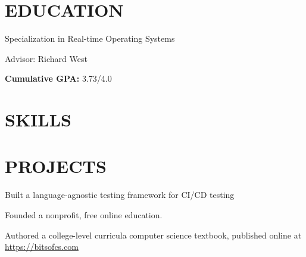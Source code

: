 \documentclass[10pt]{article} 
\begin{document}
\begin{FlushLeft}

  \section{EDUCATION}
  \begin{itemize}{
    \item Specialization in Real-time Operating Systems
    \item Advisor: Richard West}            
  \end{itemize}
  \begin{itemize}{
    \item \textbf{Cumulative GPA:} 3.73/4.0 }
  \end{itemize}
  \resumevspace

  \section{SKILLS}
  \vspace{-0.75em}
  \begin{itemize}{
     }
  \end{itemize}

  \section{PROJECTS}
  \begin{itemize}{
    \item Built a language-agnostic testing framework for CI/CD
      testing }
  \end{itemize}  
  \begin{itemize}{
    \item Founded a nonprofit, free online education.
    \item Authored a college-level curricula computer science
      textbook, published online at \href{https://bitsofcs.com}{https://bitsofcs.com}
      }
  \end{itemize}
  

\end{FlushLeft}
\end{document}
